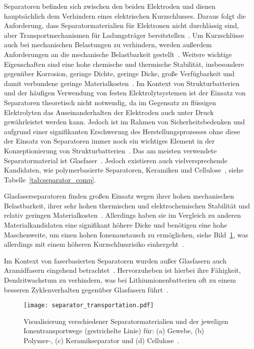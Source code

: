 Separatoren befinden sich zwischen den beiden Elektroden und dienen hauptsächlich dem Verhindern eines elektrischen Kurzschlusses. Daraus folgt die Anforderung, dass Separatormaterialien für Elektronen nicht durchlässig sind, aber Transportmechanismen für Ladungsträger bereitstellen~\cite{Kurzweil2015}. Um Kurzschlüsse auch bei mechanischen Belastungen zu verhindern, werden außerdem Anforderungen an die mechanische Belastbarkeit gestellt~\cite{Asp2015}. Weitere wichtige Eigenschaften sind eine hohe chemische und thermische Stabilität, insbesondere gegenüber Korrosion, geringe Dichte, geringe Dicke, große Verfügbarkeit und damit verbundene geringe Materialkosten~\cite{Beard2019}. Im Kontext von Strukturbatterien und der häufigen Verwendung von festen Elektrolytsystemen ist der Einsatz von Separatoren theoretisch nicht notwendig, da im Gegensatz zu flüssigen Elektrolyten das Auseinanderhalten der Elektroden auch unter Druck gewährleistet werden kann. Jedoch ist im Rahmen von Sicherheitsbedenken und aufgrund einer signifikanten Erschwerung des Herstellungsprozesses ohne diese der Einsatz von Separatoren immer noch ein wichtiges Element in der Konzeptionierung von Strukturbatterien~\cite{Asp2015, Hubert2022}. Das am meisten verwendete Separatormaterial ist Glasfaser~\cite{Zhou2022}. Jedoch existieren auch vielversprechende Kandidaten, wie polymerbasierte Separatoren, Keramiken und Cellulose~\cite{Simon2008, Greenhalgh2023}, siehe Tabelle~\ref{tab:separator_comp}.



Glasfaserseparatoren finden großen Einsatz wegen ihrer hohen mechanischen Belastbarkeit, ihrer sehr hohen thermischen und elektrochemischen Stabilität und relativ geringen Materialkosten~\cite{Luo2015,Asp2019,Asp2021,Liu2022}. Allerdings haben sie im Vergleich zu anderen Materialkandidaten eine signifikant höhere Dicke und benötigen eine hohe Maschenweite, um einen hohen Ionenaustausch zu ermöglichen, siehe Bild~\ref{fig:separator_transportation}, was allerdings mit einem höheren Kurzschlussrisiko einhergeht~\cite{Danzi2021,Zhou2022}. 

Im Kontext von faserbasierten Separatoren wurden außer Glasfasern auch Aramidfasern eingehend betrachtet~\cite{Jin2023}. Hervorzuheben ist hierbei ihre Fähigkeit, Dendritwachstum zu verhindern, was bei Lithiumionenbatterien oft zu einem besseren Zyklenverhalten gegenüber Glasfasern führt~\cite{Tung2015,Wang2021a}.

\begin{figure}[ht]
        \center
	\texttt{[image: separator\_transportation.pdf]}
		\caption{\label{fig:separator_transportation}Visualisierung verschiedener Separatormaterialien und der jeweligen Ionentransportwege (gestrichelte Linie) für: (a) Gewebe, (b) Polymer-, (c) Keramikseparator und (d) Cellulose~\cite{Zschiebsch2024}.}
\end{figure}


